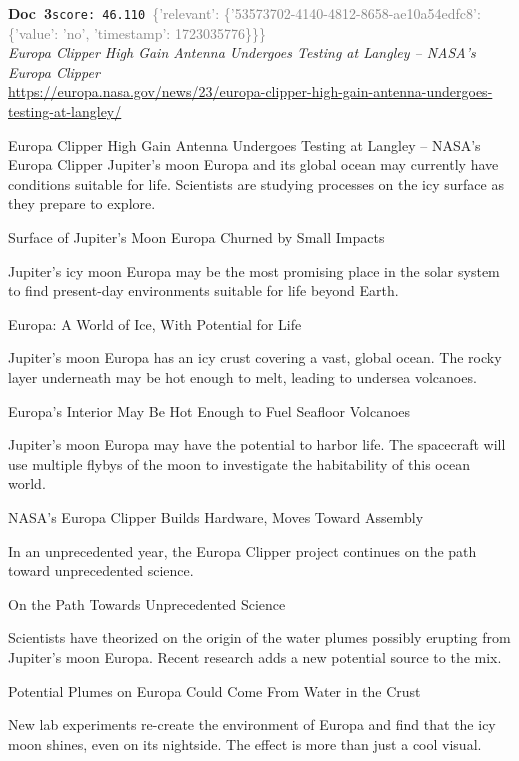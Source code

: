 \documentclass[a4paper,11pt]{article}
\begin{document}
\begin{docenv}
{\footnotesize\textcolor{doccolor}{\textbf{Doc~3}}}\hfill{\tiny\texttt{score:~46.110}}\ {\tiny\textcolor{gray}{\{'relevant': \{'53573702-4140-4812-8658-ae10a54edfc8': \{'value': 'no', 'timestamp': 1723035776\}\}\}}}\\[3pt]
{\small\textit{Europa Clipper High Gain Antenna Undergoes Testing at Langley – NASA's Europa Clipper}}\\[2pt]
{\tiny\url{https://europa.nasa.gov/news/23/europa-clipper-high-gain-antenna-undergoes-testing-at-langley/}}\\[4pt]
{\footnotesize Europa Clipper High Gain Antenna Undergoes Testing at Langley – NASA's Europa Clipper
Jupiter’s moon Europa and its global ocean may currently have conditions suitable for life. Scientists are studying processes on the icy surface as they prepare to explore.

Surface of Jupiter's Moon Europa Churned by Small Impacts

Jupiter’s icy moon Europa may be the most promising place in the solar system to find present-day environments suitable for life beyond Earth. 

Europa: A World of Ice, With Potential for Life

Jupiter’s moon Europa has an icy crust covering a vast, global ocean. The rocky layer underneath may be hot enough to melt, leading to undersea volcanoes.

Europa's Interior May Be Hot Enough to Fuel Seafloor Volcanoes

Jupiter’s moon Europa may have the potential to harbor life. The spacecraft will use multiple flybys of the moon to investigate the habitability of this ocean world.

NASA's Europa Clipper Builds Hardware, Moves Toward Assembly

In an unprecedented year, the Europa Clipper project continues on the path toward unprecedented science. 

On the Path Towards Unprecedented Science

Scientists have theorized on the origin of the water plumes possibly erupting from Jupiter's moon Europa. Recent research adds a new potential source to the mix.

Potential Plumes on Europa Could Come From Water in the Crust

New lab experiments re-create the environment of Europa and find that the icy moon shines, even on its nightside. The effect is more than just a cool visual.

}
\end{docenv}
\end{document}
